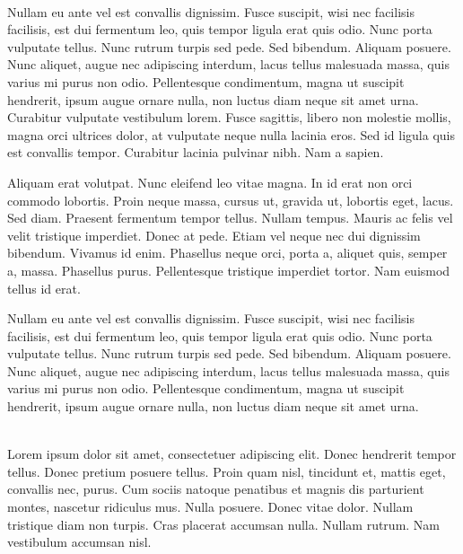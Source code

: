 \begin{titlepage}
\vspace{2cm}
\begin{addmargin}[-1cm]{-4cm}
\begin{flushright}
\sffamily\LARGE\titleen
\end{flushright}
\vfill
\noindent
\begin{minipage}[t]{9cm}

\\
Nullam eu ante vel est convallis dignissim.  Fusce suscipit, wisi nec facilisis
facilisis, est dui fermentum leo, quis tempor ligula erat quis odio.  Nunc porta
vulputate tellus.  Nunc rutrum turpis sed pede.  Sed bibendum.  Aliquam posuere.
Nunc aliquet, augue nec adipiscing interdum, lacus tellus malesuada massa, quis
varius mi purus non odio.  Pellentesque condimentum, magna ut suscipit
hendrerit, ipsum augue ornare nulla, non luctus diam neque sit amet urna.
Curabitur vulputate vestibulum lorem.  Fusce sagittis, libero non molestie
mollis, magna orci ultrices dolor, at vulputate neque nulla lacinia eros.  Sed
id ligula quis est convallis tempor.  Curabitur lacinia pulvinar nibh.  Nam a
sapien.

Aliquam erat volutpat.  Nunc eleifend leo vitae magna.  In id erat non orci
commodo lobortis.  Proin neque massa, cursus ut, gravida ut, lobortis eget,
lacus.  Sed diam.  Praesent fermentum tempor tellus.  Nullam tempus.  Mauris ac
felis vel velit tristique imperdiet.  Donec at pede.  Etiam vel neque nec dui
dignissim bibendum.  Vivamus id enim.  Phasellus neque orci, porta a, aliquet
quis, semper a, massa.  Phasellus purus.  Pellentesque tristique imperdiet
tortor.  Nam euismod tellus id erat.

Nullam eu ante vel est convallis dignissim.  Fusce suscipit, wisi nec facilisis
facilisis, est dui fermentum leo, quis tempor ligula erat quis odio.  Nunc porta
vulputate tellus.  Nunc rutrum turpis sed pede.  Sed bibendum.  Aliquam posuere.
Nunc aliquet, augue nec adipiscing interdum, lacus tellus malesuada massa, quis
varius mi purus non odio.  Pellentesque condimentum, magna ut suscipit
hendrerit, ipsum augue ornare nulla, non luctus diam neque sit amet urna.
\end{minipage}%
\hspace{1cm}%
\begin{minipage}[t]{9cm}
\\
Lorem ipsum dolor sit amet, consectetuer adipiscing elit.  Donec hendrerit
tempor tellus.  Donec pretium posuere tellus.  Proin quam nisl, tincidunt et,
mattis eget, convallis nec, purus.  Cum sociis natoque penatibus et magnis dis
parturient montes, nascetur ridiculus mus.  Nulla posuere.  Donec vitae dolor.
Nullam tristique diam non turpis.  Cras placerat accumsan nulla.  Nullam rutrum.
Nam vestibulum accumsan nisl.


\end{minipage}
\end{addmargin}
\end{titlepage}
